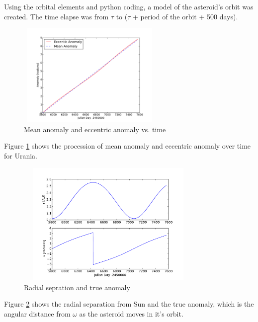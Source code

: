 \documentclass[a4paper,12pt]{article}
\begin{document}
Using the orbital elements and python coding, a model of the asteroid's orbit was created. The time elapse was from $\tau$ to ($\tau$ + period of the orbit + 500 days). 

\label{sec:orbit}
\begin{figure}[H]
\centering
	\includegraphics [angle=0,height=5cm,width=7cm]{pic/urania_EM.pdf} 
\caption{Mean anomaly and eccentric anomaly vs. time}
\label{fig:EM}
\end{figure}
Figure \ref{fig:EM} shows the procession of mean anomaly and eccentric anomaly over time for Urania.

\begin{figure}[H]
\centering
	\includegraphics [angle=0,height=6cm,width=9cm]{pic/urania_rv.pdf} 
\caption{Radial sepration and true anomaly}
\label{fig:rv}
\end{figure}
Figure \ref{fig:rv} shows the radial separation from Sun and the true anomaly, which is the angular distance from $\omega$ as the asteroid moves in it's orbit.
\end{document}
